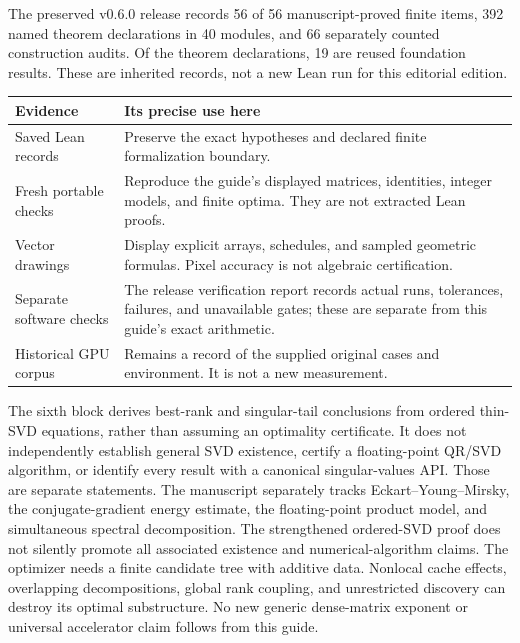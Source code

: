 The preserved v0.6.0 release records 56 of 56 manuscript-proved finite items, 392 named theorem declarations in 40 modules, and 66 separately counted construction audits. Of the theorem declarations, 19 are reused foundation results. These are inherited records, not a new Lean run for this editorial edition.

\begin{tabularx}{\linewidth}{@{}p{.25\linewidth}Y@{}}\toprule
Evidence & Its precise use here \\\midrule
Saved Lean records & Preserve the exact hypotheses and declared finite formalization boundary.\\
Fresh portable checks & Reproduce the guide's displayed matrices, identities, integer models, and finite optima. They are not extracted Lean proofs.\\
Vector drawings & Display explicit arrays, schedules, and sampled geometric formulas. Pixel accuracy is not algebraic certification.\\
Separate software checks & The release verification report records actual runs, tolerances, failures, and unavailable gates; these are separate from this guide's exact arithmetic.\\
Historical GPU corpus & Remains a record of the supplied original cases and environment. It is not a new measurement.\\\bottomrule
\end{tabularx}
The sixth block derives best-rank and singular-tail conclusions from ordered thin-SVD equations, rather than assuming an optimality certificate. It does not independently establish general SVD existence, certify a floating-point QR/SVD algorithm, or identify every result with a canonical singular-values API. Those are separate statements.
The manuscript separately tracks Eckart--Young--Mirsky, the conjugate-gradient energy estimate, the floating-point product model, and simultaneous spectral decomposition. The strengthened ordered-SVD proof does not silently promote all associated existence and numerical-algorithm claims.
The optimizer needs a finite candidate tree with additive data. Nonlocal cache effects, overlapping decompositions, global rank coupling, and unrestricted discovery can destroy its optimal substructure. No new generic dense-matrix exponent or universal accelerator claim follows from this guide.
